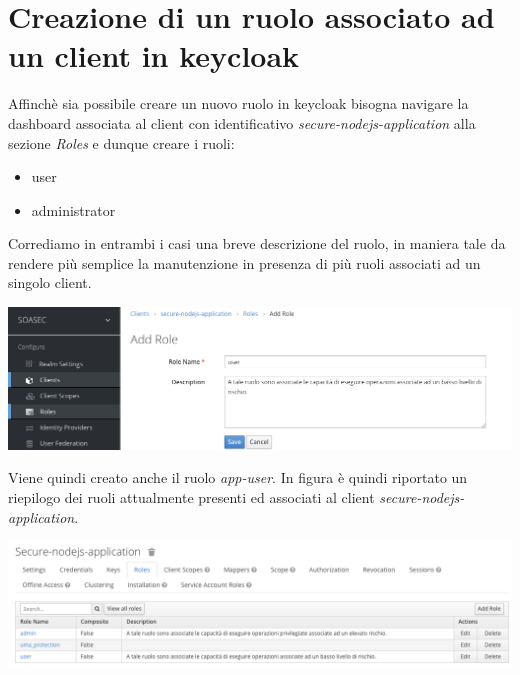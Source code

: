 \documentclass[twoside]{report}
\begin{document}
\section{Creazione di un ruolo associato ad un client in keycloak}

Affinchè sia possibile creare un nuovo ruolo in keycloak bisogna navigare la dashboard associata al client con identificativo \textit{secure-nodejs-application} alla sezione \textit{Roles} e dunque creare i ruoli:

\begin{itemize}
	\item user
	\item administrator
\end{itemize}

Corrediamo in entrambi i casi una breve descrizione del ruolo, in maniera tale da rendere più semplice la manutenzione in presenza di più ruoli associati ad un singolo client.

\begin{minipage}{\linewidth}
    \vspace{2mm}
    \centering
    \includegraphics[width= \linewidth]{13.png}
    \vspace{2mm}
\end{minipage}

Viene quindi creato anche il ruolo \textit{app-user}.
\bigbreak
In figura è quindi riportato un riepilogo dei ruoli attualmente presenti ed associati al client \textit{secure-nodejs-application}.

\begin{minipage}{\linewidth}
    \vspace{2mm}
    \centering
    \includegraphics[width= \linewidth]{14.png}
    \vspace{2mm}
\end{minipage}
\end{document}
